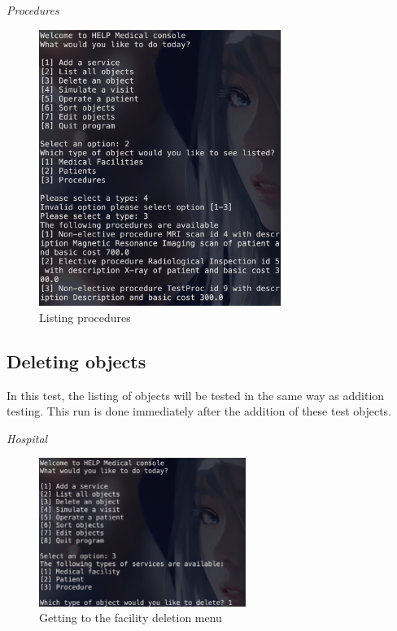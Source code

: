 \documentclass{article}
\begin{document}
	\textit{Procedures}
	\begin{figure}
		\begin{center}
			\includegraphics[width=0.7\textwidth]{figures/Listing/Listing_Procedures.png}
		\end{center}
		\caption{Listing procedures}\label{fig:listing_procedures}
	\end{figure}

  \pagebreak

	\subsection{Deleting objects}\label{sub:deleting_objects} %
	In this test, the listing of objects will be tested in the same way as addition testing. This run is done immediately after the addition of these test objects.

	\textit{Hospital}
	\begin{figure}
		\begin{center}
			\includegraphics[width=0.6\textwidth]{figures/Deleting/Deleting_Hospital_01.png}
		\end{center}
		\caption{Getting to the facility deletion menu}\label{fig:deleting_hospital_01}
	\end{figure}
	
\end{document}
